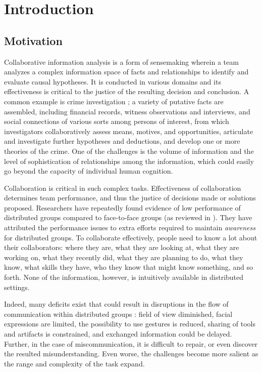 \section{Introduction}\label{introduction}

\subsection{Motivation}

Collaborative information analysis is a form of sensemaking wherein a team analyzes a complex information space of facts and relationships to identify and evaluate causal hypotheses. It is conducted in various domains and its effectiveness is critical to the justice of the resulting decision and conclusion. A common example is crime investigation \citep{kirk1953crime}; a variety of putative facts are assembled, including financial records, witness observations and interviews, and social connections of various sorts among persons of interest, from which investigators collaboratively assess means, motives, and opportunities, articulate and investigate further hypotheses and deductions, and develop one or more theories of the crime. One of the challenges is the volume of information and the level of sophistication of relationships among the information, which could easily go beyond the capacity of individual human cognition. 

Collaboration is critical in such complex tasks. Effectiveness of collaboration determines team performance, and thus the justice of decisions made or solutions proposed. Researchers have repeatedly found evidence of low performance of distributed groups compared to face-to-face groups (as reviewed in \cite{Olson2000}). They have attributed the performance issues to extra efforts required to maintain \textit{awareness} \citep{Heath2002d, Gutwin1998f} for distributed groups. To collaborate effectively, people need to know a lot about their collaborators: where they are, what they are looking at, what they are working on, what they recently did, what they are planning to do, what they know, what skills they have, who they know that might know something, and so forth. None of the information, however, is intuitively available in distributed settings.

 Indeed, many deficits exist that could result in disruptions in the flow of communication within distributed groups \citep{Carroll2009i}: field of view diminished, facial expressions are limited, the possibility to use gestures is reduced, sharing of tools and artifacts is constrained, and exchanged information could be delayed. Further, in the case of miscommunication, it is difficult to repair, or even discover the resulted misunderstanding. Even worse, the challenges become more salient as the range and complexity of the task expand. 
 
